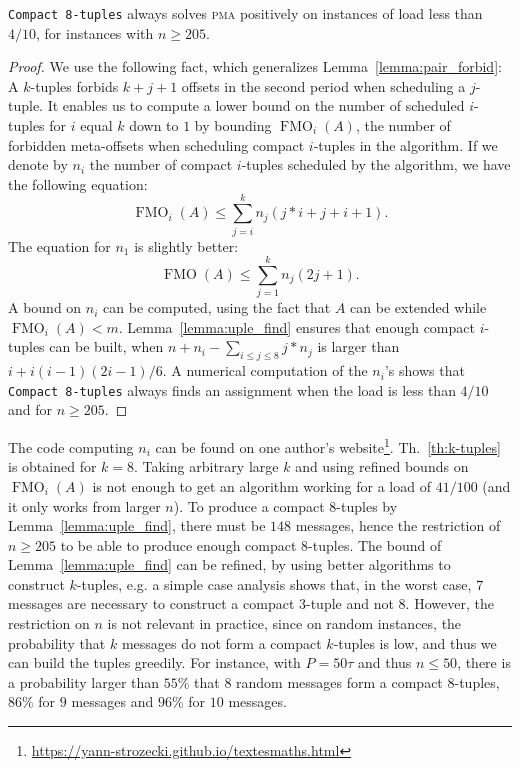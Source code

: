 \documentclass[a4paper,UKenglish,cleveref, autoref, thm-restate]{lipics-v2019}
\DeclareMathOperator{\Fmo}{FMO}
\newcommand\pma{\textsc{pma}\xspace}
\begin{document}
\begin{theorem}\label{th:k-tuples}
\texttt{Compact 8-tuples} always solves \pma positively on instances of load less than $4/10$, for instances with $n \geq 205$.
\end{theorem}
\begin{proof}
We use the following fact, which generalizes Lemma~\ref{lemma:pair_forbid}: A $k$-tuples forbids $k+j+1$ offsets in the second period when scheduling a $j$-tuple. 
It enables us to compute a lower bound on the number of scheduled $i$-tuples for $i$ equal $k$ down to $1$ by bounding $\Fmo_i(A)$, the number of forbidden meta-offsets when scheduling compact $i$-tuples in the algorithm.
If we denote by $n_i$ the number of compact $i$-tuples scheduled by the algorithm,
we have the following equation:  $$ \Fmo_i(A) \leq \displaystyle{\sum_{j=i}^k n_j(j*i + j + i+ 1)}.$$
The equation for $n_1$ is slightly better: 
$$ \Fmo(A) \leq \displaystyle{\sum_{j=1}^k n_j(2j + 1)}.$$
A bound on $n_i$ can be computed, using the fact that $A$ can be extended while $\Fmo_i(A) < m$. 
Lemma~\ref{lemma:uple_find} ensures that enough compact $i$-tuples can be built, when $n + n_i - \sum_{i \leq j \leq 8} j*n_j$ is larger than $i + i(i-1)(2i-1)/6$. 
A numerical computation of the $n_i$'s shows that \texttt{Compact 8-tuples} always finds an assignment when the load is less than $4/10$ and for $n \geq 205$.
\end{proof}

The code computing $n_i$ can be found on one author's website\footnote{\url{https://yann-strozecki.github.io/textesmaths.html}}. Th.~\ref{th:k-tuples} is obtained for $k=8$. Taking arbitrary large $k$ and using refined bounds on $\Fmo_i(A)$ is not enough to get an algorithm working for a load of $41/100$ (and it only works from larger $n$). To produce a compact $8$-tuples by Lemma~\ref{lemma:uple_find}, there must be $148$ messages, hence the restriction of $n \geq 205$ to be able to produce enough compact $8$-tuples.
The bound of Lemma~\ref{lemma:uple_find} can be refined, by using better algorithms to construct $k$-tuples, e.g. a simple case analysis shows that, in the worst case, $7$ messages are necessary to construct a compact $3$-tuple and not $8$. However, the restriction on $n$ is not relevant in practice, since on random instances, the probability that $k$ messages do not form a compact $k$-tuples is low, and thus we can build the tuples greedily. For instance, with $P=50\tau$ and thus $n \leq 50$, there is a probability larger than $55\%$ that $8$ random messages form a compact $8$-tuples, $86\%$ for $9$ messages and $96\%$ for $10$ messages.
\end{document}
